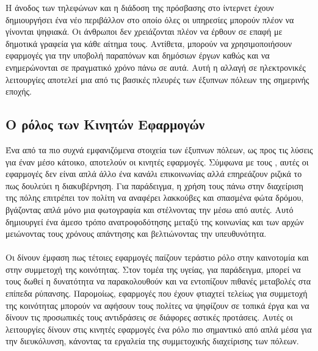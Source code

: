 Η άνοδος των τηλεφώνων και η διάδοση της πρόσβασης στο ίντερνετ έχουν δημιουργήσει ένα νέο περιβάλλον στο οποίο όλες οι υπηρεσίες μπορούν πλέον να γίνονται ψηφιακά. Οι άνθρωποι δεν χρειάζονται πλέον να έρθουν σε επαφή με δημοτικά γραφεία για κάθε αίτημα τους. Αντίθετα, μπορούν να χρησιμοποιήσουν εφαρμογές για την υποβολή παραπόνων και δημόσιων έργων καθώς και να ενημερώνονται σε πραγματικό χρόνο πάνω σε αυτά. Αυτή η αλλαγή σε ηλεκτρονικές λειτουργίες αποτελεί μια από τις βασικές πλευρές των έξυπνων πόλεων της σημερινής εποχής.

\subsection{Ο ρόλος των Κινητών Εφαρμογών}
Ένα από τα πιο συχνά εμφανιζόμενα στοιχεία των έξυπνων πόλεων, ως προς τις λύσεις για έναν μέσο κάτοικο, αποτελούν οι κινητές εφαρμογές. Σύμφωνα με τους \textcite{hou2020road}, αυτές οι εφαρμογές δεν είναι απλά άλλο ένα κανάλι επικοινωνίας αλλά επηρεάζουν ριζικά το πως δουλεύει η διακυβέρνηση. Για παράδειγμα, η χρήση τους πάνω στην διαχείριση της πόλης επιτρέπει τον πολίτη να αναφέρει λακκούβες και σπασμένα φώτα δρόμου, βγάζοντας απλά μόνο μια φωτογραφία και στέλνοντας την μέσω από αυτές. Αυτό δημιουργεί ένα άμεσο τρόπο ανατροφοδότησης μεταξύ της κοινωνίας και των αρχών μειώνοντας τους χρόνους απάντησης και βελτιώνοντας την υπευθυνότητα.
\\
\\
Οι \textcite{boulos2015social} δίνουν έμφαση πως τέτοιες εφαρμογές παίζουν τεράστιο ρόλο στην καινοτομία και στην συμμετοχή της κοινότητας. Στον τομέα της υγείας, για παράδειγμα, μπορεί να τους δωθεί η δυνατότητα να παρακολουθούν και να εντοπίζουν πιθανές μεταβολές στα επίπεδα ρύπανσης. Παρομοίως, εφαρμογές που έχουν φτιαχτεί τελείως για συμμετοχή της κοινότητας μπορούν να αφήσουν τους πολίτες να ψηφίζουν σε τοπικά έργα και να δίνουν τις προσωπικές τους αντιδράσεις σε διάφορες αστικές προτάσεις. Αυτές οι λειτουργίες δίνουν στις κινητές εφαρμογές ένα ρόλο πιο σημαντικό από απλά μέσα για την διευκόλυνση, κάνοντας τα εργαλεία της συμμετοχικής διαχείρισης των πόλεων.

